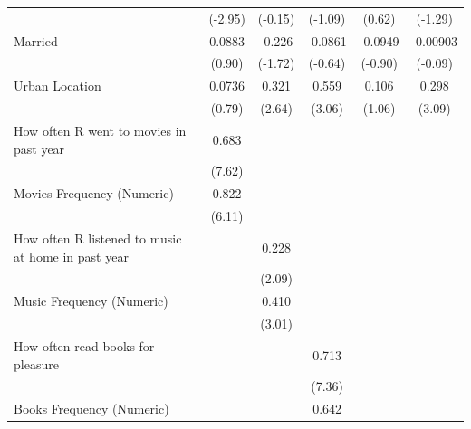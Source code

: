 {\begin{longtable}{l*{5}{c}}
                    &     (-2.95)       &     (-0.15)       &     (-1.09)       &      (0.62)       &     (-1.29)       \\
Married             &      0.0883       &      -0.226\sym{*}&     -0.0861       &     -0.0949       &    -0.00903       \\
                    &      (0.90)       &     (-1.72)       &     (-0.64)       &     (-0.90)       &     (-0.09)       \\
Urban Location      &      0.0736       &       0.321\sym{*}&       0.559\sym{*}&       0.106       &       0.298\sym{*}\\
                    &      (0.79)       &      (2.64)       &      (3.06)       &      (1.06)       &      (3.09)       \\
How often R went to movies in past year&       0.683\sym{*}&                   &                   &                   &                   \\
                    &      (7.62)       &                   &                   &                   &                   \\
Movies Frequency (Numeric)&       0.822\sym{*}&                   &                   &                   &                   \\
                    &      (6.11)       &                   &                   &                   &                   \\
How often R listened to music at home in past year&                   &       0.228\sym{*}&                   &                   &                   \\
                    &                   &      (2.09)       &                   &                   &                   \\
Music Frequency (Numeric)&                   &       0.410\sym{*}&                   &                   &                   \\
                    &                   &      (3.01)       &                   &                   &                   \\
How often read books for pleasure&                   &                   &       0.713\sym{*}&                   &                   \\
                    &                   &                   &      (7.36)       &                   &                   \\
Books Frequency (Numeric)&                   &                   &       0.642\sym{*}&                   &                   \\

\end{longtable}}
